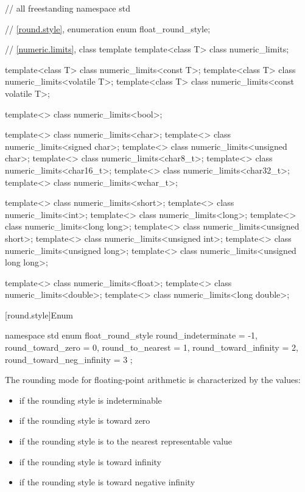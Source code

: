 \begin{codeblock}
// all freestanding
namespace std {
  // \ref{round.style}, enumeration 
  enum float_round_style;

  // \ref{numeric.limits}, class template 
  template<class T> class numeric_limits;

  template<class T> class numeric_limits<const T>;
  template<class T> class numeric_limits<volatile T>;
  template<class T> class numeric_limits<const volatile T>;

  template<> class numeric_limits<bool>;

  template<> class numeric_limits<char>;
  template<> class numeric_limits<signed char>;
  template<> class numeric_limits<unsigned char>;
  template<> class numeric_limits<char8_t>;
  template<> class numeric_limits<char16_t>;
  template<> class numeric_limits<char32_t>;
  template<> class numeric_limits<wchar_t>;

  template<> class numeric_limits<short>;
  template<> class numeric_limits<int>;
  template<> class numeric_limits<long>;
  template<> class numeric_limits<long long>;
  template<> class numeric_limits<unsigned short>;
  template<> class numeric_limits<unsigned int>;
  template<> class numeric_limits<unsigned long>;
  template<> class numeric_limits<unsigned long long>;

  template<> class numeric_limits<float>;
  template<> class numeric_limits<double>;
  template<> class numeric_limits<long double>;
}
\end{codeblock}

[round.style]{Enum }

%
\begin{codeblock}
namespace std {
  enum float_round_style {
    round_indeterminate       = -1,
    round_toward_zero         =  0,
    round_to_nearest          =  1,
    round_toward_infinity     =  2,
    round_toward_neg_infinity =  3
  };
}
\end{codeblock}

\pnum
The rounding mode for floating-point arithmetic is characterized by the
values:
\begin{itemize}
\item
{}%
if the rounding style is indeterminable
\item
{}%
if the rounding style is toward zero
\item
{}%
if the rounding style is to the nearest representable value
\item
{}%
if the rounding style is toward infinity
\item
{}%
if the rounding style is toward negative infinity
\end{itemize}

